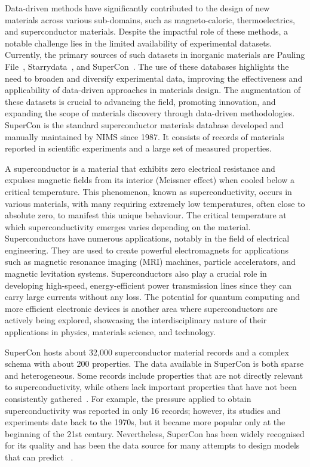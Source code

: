 Data-driven methods have significantly contributed to the design of new materials across various sub-domains, such as magneto-caloric, thermoelectrics, and superconductor materials. Despite the impactful role of these methods, a notable challenge lies in the limited availability of experimental datasets. 
Currently, the primary sources of such datasets in inorganic materials are Pauling File~\cite{Blokhin2018ThePF_paulingFile}, Starrydata~\cite{katsura2019data}, and SuperCon~\cite{ishii2023structuring}. 
The use of these databases highlights the need to broaden and diversify experimental data, improving the effectiveness and applicability of data-driven approaches in materials design. 
The augmentation of these datasets is crucial to advancing the field, promoting innovation, and expanding the scope of materials discovery through data-driven methodologies.
SuperCon is the standard superconductor materials database developed and manually maintained by NIMS since 1987. 
It consists of records of materials reported in scientific experiments and a large set of measured properties. 

A superconductor is a material that exhibits zero electrical resistance and expulses magnetic fields from its interior (Meissner effect) when cooled below a critical temperature. This phenomenon, known as superconductivity, occurs in various materials, with many requiring extremely low temperatures, often close to absolute zero, to manifest this unique behaviour. The critical temperature at which superconductivity emerges varies depending on the material. 
Superconductors have numerous applications, notably in the field of electrical engineering. They are used to create powerful electromagnets for applications such as magnetic resonance imaging (MRI) machines, particle accelerators, and magnetic levitation systems. 
Superconductors also play a crucial role in developing high-speed, energy-efficient power transmission lines since they can carry large currents without any loss. The potential for quantum computing and more efficient electronic devices is another area where superconductors are actively being explored, showcasing the interdisciplinary nature of their applications in physics, materials science, and technology.

SuperCon hosts about 32,000 superconductor material records and a complex schema with about 200 properties. 
The data available in SuperCon is both sparse and heterogeneous. Some records include properties that are not directly relevant to superconductivity, while others lack important properties that have not been consistently gathered~\cite{sommer20223dsc}.
For example, the pressure applied to obtain superconductivity was reported in only 16 records; however, its studies and experiments date back to the 1970s, but it became more popular only at the beginning of the 21st century.  
Nevertheless, SuperCon has been widely recognised for its quality and has been the data source for many attempts to design models that can predict \tc~\cite{stanev2017machine, le2020critical, Hamlin2019SuperconductivityNR}. 


